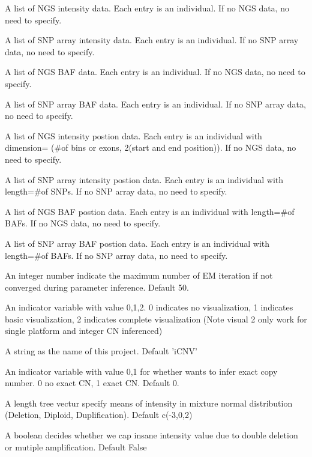 \documentclass[a4paper]{book}
\begin{document}
\begin{Arguments}
\begin{ldescription}
\item[\code{ngs\_plr}] A list of NGS intensity data. Each entry is an individual. If no NGS data, no need to specify.

\item[\code{snp\_lrr}] A list of SNP array intensity data. Each entry is an individual. If no SNP array data, no need to specify.

\item[\code{ngs\_baf}] A list of NGS BAF data. Each entry is an individual. If no NGS data, no need to specify.

\item[\code{snp\_baf}] A list of SNP array BAF data. Each entry is an individual. If no SNP array data, no need to specify.

\item[\code{ngs\_plr.pos}] A list of NGS intensity postion data. Each entry is an individual with dimension= (\#of bins or exons, 2(start and end position)). If no NGS data, no need to specify.

\item[\code{snp\_lrr.pos}] A list of SNP array intensity postion data. Each entry is an individual with length=\#of SNPs. If no SNP array data, no need to specify.

\item[\code{ngs\_baf.pos}] A list of NGS BAF postion data. Each entry is an individual with length=\#of BAFs. If no NGS data, no need to specify.

\item[\code{snp\_baf.pos}] A list of SNP array BAF postion data. Each entry is an individual with length=\#of BAFs. If no SNP array data, no need to specify.

\item[\code{maxIt}] An integer number indicate the maximum number of EM iteration if not converged during parameter inference. Default 50.

\item[\code{visual}] An indicator variable with value 0,1,2. 0 indicates no visualization, 1 indicates basic visualization, 2 indicates complete visualization (Note visual 2 only work for single platform and integer CN inferenced)

\item[\code{projname}] A string as the name of this project. Default 'iCNV'

\item[\code{CN}] An indicator variable with value 0,1 for whether wants to infer exact copy number. 0 no exact CN, 1 exact CN. Default 0.

\item[\code{mu}] A length tree vectur specify means of intensity in mixture normal distribution (Deletion, Diploid, Duplification). Default c(-3,0,2)

\item[\code{cap}] A boolean decides whether we cap insane intensity value due to double deletion or mutiple amplification. Default False
\end{ldescription}
\end{Arguments}
\end{document}
